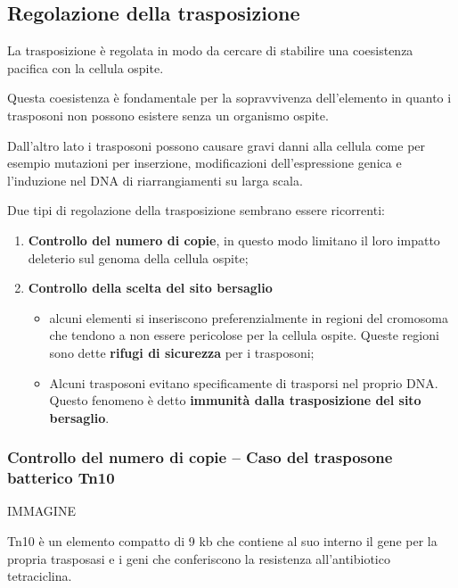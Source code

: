 \documentclass[]{article}
\begin{document}
\subsection{Regolazione della
trasposizione}\label{regolazione-della-trasposizione}

La trasposizione è regolata in modo da cercare di stabilire una
coesistenza pacifica con la cellula ospite.

Questa coesistenza è fondamentale per la sopravvivenza dell'elemento in
quanto i trasposoni non possono esistere senza un organismo ospite.

Dall'altro lato i trasposoni possono causare gravi danni alla cellula
come per esempio mutazioni per inserzione, modificazioni
dell'espressione genica e l'induzione nel DNA di riarrangiamenti su
larga scala.

Due tipi di regolazione della trasposizione sembrano essere ricorrenti:

\begin{enumerate}
\def\labelenumi{\arabic{enumi}.}
\itemsep1pt\parskip0pt
\item
  \textbf{Controllo del numero di copie}, in questo modo limitano il
  loro impatto deleterio sul genoma della cellula ospite;
\item
  \textbf{Controllo della scelta del sito bersaglio}

  \begin{itemize}
  \itemsep1pt\parskip0pt
  \item
    alcuni elementi si inseriscono preferenzialmente in regioni del
    cromosoma che tendono a non essere pericolose per la cellula ospite.
    Queste regioni sono dette \textbf{rifugi di sicurezza} per i
    trasposoni;
  \item
    Alcuni trasposoni evitano specificamente di trasporsi nel proprio
    DNA. Questo fenomeno è detto \textbf{immunità dalla trasposizione
    del sito bersaglio}.
  \end{itemize}
\end{enumerate}

\subsubsection{Controllo del numero di copie -- Caso del trasposone
batterico
Tn10}\label{controllo-del-numero-di-copie-caso-del-trasposone-batterico-tn10}

IMMAGINE

Tn10 è un elemento compatto di 9 kb che contiene al suo interno il gene
per la propria trasposasi e i geni che conferiscono la resistenza
all'antibiotico tetraciclina.
\end{document}
